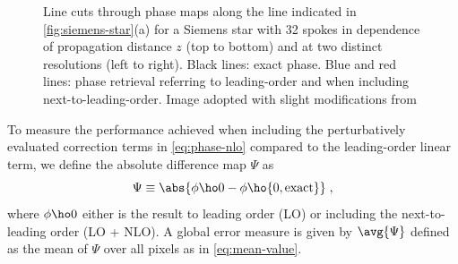\documentclass[
twoside,
openright,
titlepage,
numbers=noenddot,
headinclude,
fleqn,
a4paper,
footinclude=true,
cleardoublepage=empty,
abstractoff,
BCOR=5mm,
paper=a4,
fontsize=11pt,
british,ngerman,american,
]{scrreprt}
\begin{document}
\begin{figure}
  \caption[Line cuts in leading-order phase retrieval and
  next-to-leading-order correction from propagated intensity of a
  Siemens-star phase object.]{%
    Line cuts through phase maps along the line indicated in
    \cref{fig:siemens-star}(a) for a Siemens star with 32 spokes in
    dependence of propagation distance $z$ (top to bottom) and at two
    distinct resolutions (left to right).  Black lines: exact phase.
    Blue and red lines: phase retrieval referring to leading-order and
    when including next-to-leading-order.  Image adopted with slight
    modifications from \cite{Moosmann2010opex}}
    \label{fig:siemens-star-cuts}
\end{figure}

To measure the performance achieved when including the perturbatively
evaluated correction terms in \cref{eq:phase-nlo} compared to the
leading-order linear term, we define the absolute difference map
$\Psi$ as 
\begin{equation}
  \label{eq:error-measure}
  \Psi \equiv \abs{\phi\ho0 -\phi\ho{0,\mathrm{exact}}} \;,
\end{equation}
where $\phi\ho0$ either is the result to leading order (LO) or
including the next-to-leading order (LO + NLO).  A global error
measure is given by $\avg{\Psi}$ defined as the mean of $\Psi$ over
all pixels as in \cref{eq:mean-value}.
\end{document}
